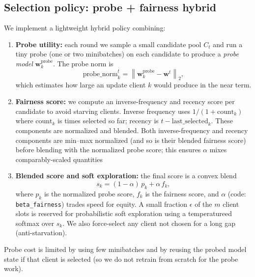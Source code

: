 \documentclass[10pt,twocolumn,letterpaper]{article}
\begin{document}
\subsection{Selection policy: probe + fairness hybrid}
We implement a lightweight hybrid policy combining:
\begin{enumerate}
  \item \textbf{Probe utility:} each round we sample a small candidate pool $C_t$ and run a tiny probe (one or two minibatches) on each candidate to produce a \emph{probe model} $\mathbf{w}_k^{\text{probe}}$. The probe norm is
  \[
    \text{probe\_norm}_k^t = \left\|\mathbf{w}_k^{\text{probe}} - \mathbf{w}^t\right\|_2,
  \]
  which estimates how large an update client $k$ would produce in the near term.
    
  
  \item \textbf{Fairness score:} we compute an inverse-frequency and recency score per candidate to avoid starving clients. Inverse frequency uses $1/(1+\text{count}_k)$ where $\text{count}_k$ is times selected so far; recency is $t - \text{last\_selected}_k$. These components are normalized and blended.
  Both inverse-frequency and recency components are min–max normalized (and so is their blended fairness score) before blending with the normalized probe score; this ensures $\alpha$ mixes comparably-scaled quantities
    
  
  \item \textbf{Blended score and soft exploration:} the final score is a convex blend
  \[
    s_k = (1-\alpha)\,p_k + \alpha\,f_k,
  \]
  where $p_k$ is the normalized probe score, $f_k$ is the fairness score, and $\alpha$ (code: \texttt{beta\_fairness}) trades speed for equity. A small fraction $\epsilon$ of the $m$ client slots is reserved for probabilistic soft exploration using a temperatureed softmax over $s_k$. We also force-select any client not chosen for a long gap (anti-starvation).
    
  
\end{enumerate}
Probe cost is limited by using few minibatches and by reusing the probed model state if that client is selected (so we do not retrain from scratch for the probe work).
    
\end{document}
